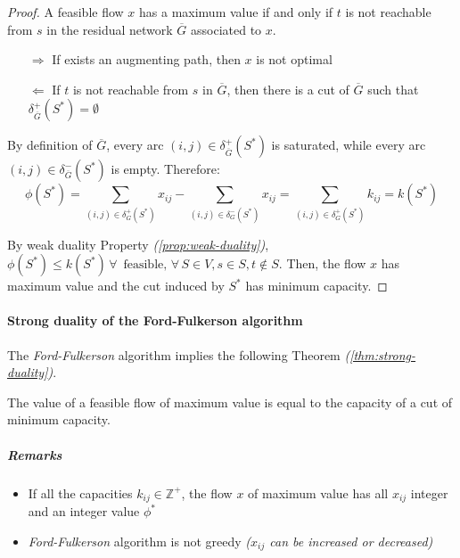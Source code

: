 \documentclass[english]{article}
\begin{document}
\begin{proof}
  A feasible flow \(x\) has a maximum value if and only if \(t\) is not reachable from \(s\) in the residual network \(\overline{G}\) associated to \(x\).

  \begin{itemize}
    \item[\(\Rightarrow\)] If exists an augmenting path, then \(x\) is not optimal
    \item[\(\Leftarrow\)] If \(t\) is not reachable from \(s\) in \(\overline{G}\), then there is a cut of \(\overline{G}\) such that \(\delta^+_{\overline{G}}(S^\ast) = \emptyset\)
  \end{itemize}

  By definition of \(\overline{G}\), every arc \(\left( i, j \right) \in \delta^+_{\overline{G}}(S^\ast)\) is saturated, while every arc \(\left( i, j \right) \in \delta^-_{\overline{G}}(S^\ast)\) is empty.
  Therefore:
  \[ \phi(S^\ast) = \displaystyle \sum_{\left( i, j \right) \in \delta^+_G(S^\ast) } x_{ij} - \displaystyle \sum_{\left( i, j \right) \in \delta^-_G(S^\ast) } x_{ij} = \displaystyle \sum_{\left( i, j \right) \in \delta^+_G(S^\ast) } k_{ij} = k(S^\ast) \]

  By weak duality Property \textit{(\ref{prop:weak-duality})}, \(\phi(S^\ast) \leq k(S^\ast) \, \forall \, \text{ feasible}, \, \forall \, S \in V, s\in S, t \notin S\).
  Then, the flow \(x\) has maximum value and the cut induced by \(S^\ast\) has minimum capacity.
\end{proof}

\paragraph{Strong duality of the Ford-Fulkerson algorithm}

The \textit{Ford-Fulkerson} algorithm implies the following Theorem \textit{(\ref{thm:strong-duality})}.

\begin{theorem}
  The value of a feasible flow of maximum value is equal to the capacity of a cut of minimum capacity.
  \label{thm:strong-duality}
\end{theorem}

\subparagraph*{Remarks}
\begin{itemize}
  \item If all the capacities \(k_{ij} \in \mathbb{Z}^+\), the flow \(x\) of maximum value has all \(x_{ij}\) integer and an integer value \(\phi^\ast\)
  \item \textit{Ford-Fulkerson} algorithm is not greedy \textit{(\(x_{ij}\) can be increased or decreased)}
\end{itemize}
\end{document}
